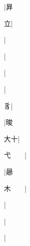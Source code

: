 \begin{multicols}{2}
{{\cjk{}{\cnsym{}　}{\cnsym{}　}{\cnsym{}　}}|{\cjk{}昪}\par
{\cjk{}{\cnsym{}　}{\cnsym{}　}立}|{}\par
{\cjk{}{\cnsym{}　}{\cnsym{}　}{\cnsym{}　}}|{}\par
{\cjk{}{\cnsym{}　}{\cnsym{}　}{\cnsym{}　}}|{}\par
{\cjk{}{\cnsym{}　}{\cnsym{}　}{\cnsym{}　}}|{}\par
{\cjk{}{\cnsym{}　}{\cnsym{}　}{\cnsym{}　}}|{}\par
{\cjk{}{\cnsym{}　}{\cnsym{}　}豸}|{}\par
{\cjk{}{\cnsym{}　}{\cnsym{}　}{\cnsym{}　}}|{\cjk{}晙}\par
{\cjk{}{\cnsym{}　}大十}|{}\par
{\cjk{}弋{\cnsym{}　}{\cnsym{}　}}|{}\par
{\cjk{}{\cnsym{}　}{\cnsym{}　}{\cnsym{}　}}|{\cjk{}曏}\par
{\cjk{}木{\cnsym{}　}{\cnsym{}　}}|{}\par
{\cjk{}{\cnsym{}　}{\cnsym{}　}{\cnsym{}　}}|{}\par
{}|{}\par
{\cjk{}{\cnsym{}　}{\cnsym{}　}{\cnsym{}　}}|{}\par
}
\end{multicols}
